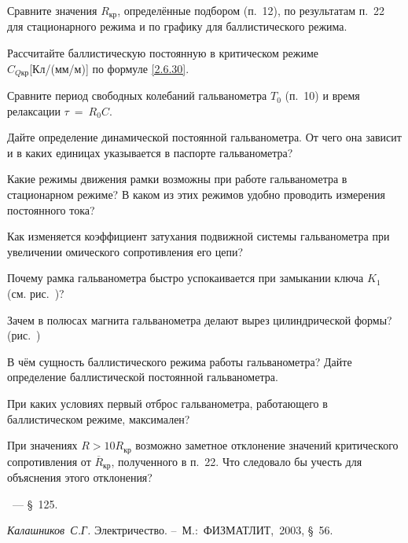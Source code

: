 \begin{lab:task}
	\item Сравните значения $R_{\text{кр}}$, определённые подбором (п.~12), по результатам
п.~22 для стационарного режима и по графику для баллистического режима.

	\item Рассчитайте баллистическую постоянную в критическом режиме\\$C_{Q \text{кр}}$[Кл/(мм/м)] по формуле \eqref{2.6.30}.

	\item Сравните период свободных колебаний гальванометра
$T_0$ (п.~10) и время релаксации $\tau~=~R_0C$.

\end{lab:task}


\begin{lab:questions}
	\item Дайте определение динамической постоянной гальванометра. От чего она
зависит и в каких единицах указывается в паспорте гальванометра?

	\item Какие режимы движения рамки возможны при работе гальванометра в
стационарном режиме? В каком из этих режимов удобно проводить измерения
постоянного тока?

	\item Как изменяется коэффициент затухания подвижной системы гальванометра
при увеличении омического сопротивления его цепи?

	\item Почему рамка гальванометра быстро успокаивается при замыкании ключа
$K_1$ (см. рис.~)?

	\item Зачем в полюсах магнита гальванометра делают вырез цилиндрической
формы? (рис.~)

	\item В чём сущность баллистического режима работы гальванометра? Дайте
определение баллистической постоянной гальванометра.

	\item При каких условиях первый отброс гальванометра, работающего в
баллистическом режиме, максимален?

	\item При значениях $R>10R_{\text{кр}}$
возможно заметное отклонение значений критического сопротивления от $\overline R_{\text{кр}}$,
полученного в п.~22. Что следовало бы учесть для объяснения этого
отклонения?
\end{lab:questions}


\begin{lab:literature}
	\item \SivuhinIII~--- \S~125.

	\item \emph{Калашников~С.Г.} Электричество. --~М.:~ФИЗМАТЛИТ,~2003, \S~56.
\end{lab:literature}
